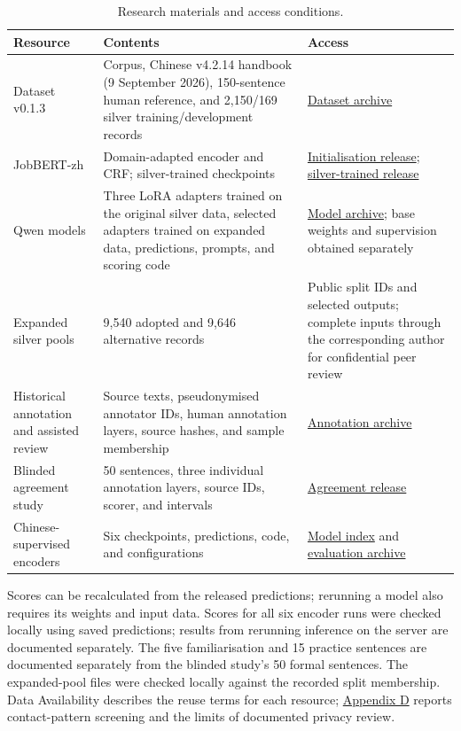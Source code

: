 \begin{table}[!htbp]
\centering\small
\caption{Research materials and access conditions.}
\label{tab:component-access}
\begin{tabularx}{\linewidth}{@{}P{.23\linewidth}L P{.29\linewidth}@{}}
\toprule
Resource & Contents & Access \\
\midrule
Dataset v0.1.3 & Corpus, Chinese v4.2.14 handbook (9 September 2026), 150-sentence human reference, and 2,150/169 silver training/development records & \href{https://doi.org/10.5281/zenodo.22698504}{Dataset archive} \\
JobBERT-zh & Domain-adapted encoder and CRF; silver-trained checkpoints & \href{https://huggingface.co/AlfredJames/jobbert-zh}{Initialisation release}; \href{https://huggingface.co/AlfredJames/jobbert-zh-v6a}{silver-trained release} \\
Qwen models & Three LoRA adapters trained on the original silver data, selected adapters trained on expanded data, predictions, prompts, and scoring code & \href{https://doi.org/10.5281/zenodo.22851581}{Model archive}; base weights and supervision obtained separately \\
Expanded silver pools & 9,540 adopted and 9,646 alternative records & Public split IDs and selected outputs; complete inputs through the corresponding author for confidential peer review \\
Historical annotation and assisted review & Source texts, pseudonymised annotator IDs, human annotation layers, source hashes, and sample membership & \href{https://github.com/AlfredJamesLi/chinese-skillspan-benchmark/blob/main/reproduction/evidence_review_20260925/annotation_layers/README.md}{Annotation archive} \\
Blinded agreement study & 50 sentences, three individual annotation layers, source IDs, scorer, and intervals & \href{https://github.com/AlfredJamesLi/chinese-skillspan-benchmark/tree/main/reproduction/agreement/finalguide_abc_20261003}{Agreement release} \\
Chinese-supervised encoders & Six checkpoints, predictions, code, and configurations & \href{https://github.com/AlfredJamesLi/chinese-skillspan-benchmark/blob/0c73207c0f9b00fa87f385b78bcb7342bd00bfcb/results_snapshots/table11_evidence_20260924/HF_RELEASE.md}{Model index} and \href{https://doi.org/10.5281/zenodo.22942441}{evaluation archive} \\
\bottomrule
\end{tabularx}
\par\smallskip\footnotesize\RaggedRight
Scores can be recalculated from the released predictions; rerunning a model also requires its weights and input data. Scores for all six encoder runs were checked locally using saved predictions; results from rerunning inference on the server are documented separately. The five familiarisation and 15 practice sentences are documented separately from the blinded study's 50 formal sentences. The expanded-pool files were checked locally against the recorded split membership. Data Availability describes the reuse terms for each resource; \hyperref[sec:resource-access]{Appendix D} reports contact-pattern screening and the limits of documented privacy review.
\end{table}
